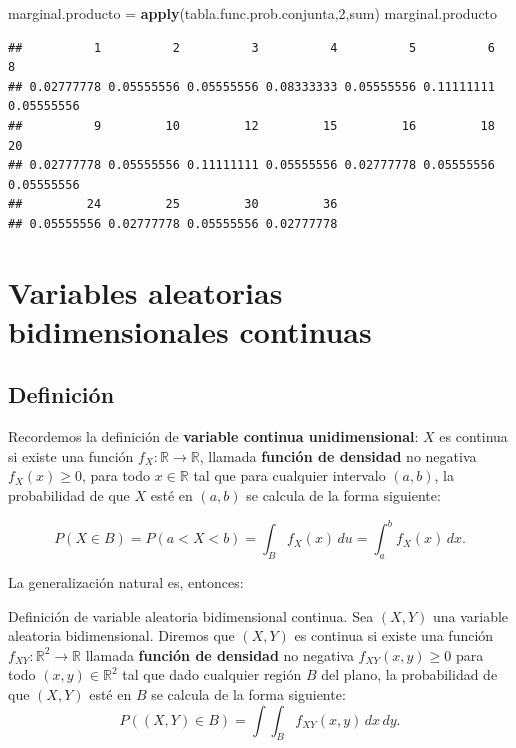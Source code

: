 \documentclass[]{book}
\newenvironment{Shaded}{\begin{snugshade}}{\end{snugshade}}
\newcommand{\DecValTok}[1]{\textcolor[rgb]{0.00,0.00,0.81}{#1}}
\newcommand{\KeywordTok}[1]{\textcolor[rgb]{0.13,0.29,0.53}{\textbf{#1}}}
\newcommand{\NormalTok}[1]{#1}
\newcommand{\StringTok}[1]{\textcolor[rgb]{0.31,0.60,0.02}{#1}}
\begin{document}
\begin{Shaded}
\begin{Highlighting}[]
\NormalTok{marginal.producto =}\StringTok{ }\KeywordTok{apply}\NormalTok{(tabla.func.prob.conjunta,}\DecValTok{2}\NormalTok{,sum)}
\NormalTok{marginal.producto}
\end{Highlighting}
\end{Shaded}

\begin{verbatim}
##          1          2          3          4          5          6          8 
## 0.02777778 0.05555556 0.05555556 0.08333333 0.05555556 0.11111111 0.05555556 
##          9         10         12         15         16         18         20 
## 0.02777778 0.05555556 0.11111111 0.05555556 0.02777778 0.05555556 0.05555556 
##         24         25         30         36 
## 0.05555556 0.02777778 0.05555556 0.02777778
\end{verbatim}

\hypertarget{variables-aleatorias-bidimensionales-continuas}{%
\section{Variables aleatorias bidimensionales continuas}\label{variables-aleatorias-bidimensionales-continuas}}

\hypertarget{definiciuxf3n-2}{%
\subsection{Definición}\label{definiciuxf3n-2}}

Recordemos la definición de \textbf{variable continua unidimensional}: \(X\) es continua si existe una función \(f_X:\mathbb{R}\longrightarrow \mathbb{R}\), llamada \textbf{función de densidad} no negativa \(f_X(x)\geq 0\), para todo \(x\in\mathbb{R}\) tal que para cualquier intervalo \((a,b)\), la probabilidad de que \(X\) esté en \((a,b)\) se calcula de la forma siguiente:

\[
P(X\in B)=P(a< X < b)=\int_B f_{X}(x)\,du=\int_a^b f_{X}(x)\,dx.
\]

La generalización natural es, entonces:

Definición de variable aleatoria bidimensional continua.
Sea \((X,Y)\) una variable aleatoria bidimensional. Diremos que \((X,Y)\) es continua si existe una función
\(f_{XY}:\mathbb{R}^2\longrightarrow \mathbb{R}\) llamada \textbf{función de densidad} no negativa \(f_{XY}(x,y)\geq 0\) para todo \((x,y)\in\mathbb{R}^2\) tal que dado cualquier región \(B\) del plano, la probabilidad de que \((X,Y)\) esté en \(B\) se calcula de la forma siguiente:
\[
P((X,Y)\in B)=\int\int_B f_{XY}(x,y)\,dx\,dy.
\]
\end{document}
